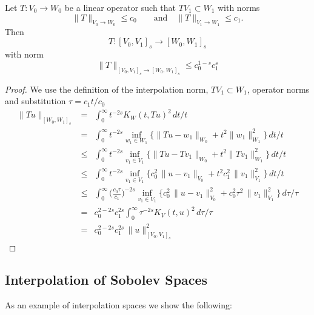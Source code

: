 \begin{theorem}
Let $T : V_0 \rightarrow W_0$ be a linear operator such that $T V_1 \subset W_1$ 
with norms
$$
\| T \|_{V_0 \rightarrow W_0} \leq c_0 \qquad \text{and} \quad 
\| T \|_{V_1 \rightarrow W_1} \leq c_1.
$$
Then
$$
T : [V_0,V_1]_s \rightarrow [W_0,W_1]_s
$$
with norm
$$
\| T \|_{[V_0,V_1]_s \rightarrow [W_0,W_1]_s} \leq c_0^{1-s} c_1^s
$$
\end{theorem} 
\begin{proof}
We use the definition of the interpolation norm, $T V_1 \subset W_1$, operator norms and substitution $\tau = c_1 t/c_0$
\begin{eqnarray*}
\| T u \|_{[W_0,W_1]_s} & = & \int_0^\infty t^{-2s} K_W(t,Tu)^2 \, dt/t \\
 & = & \int_0^\infty t^{-2s} \inf_{w_1 \in W_1} \{ \| T u - w_1 \|_{W_0} + t^2 \| w_1 \|_{W_1}^2 \} \, dt/t \\
 & \leq & \int_0^\infty t^{-2s} \inf_{v_1 \in V_1} \{ \| T u - T v_1 \|_{W_0} + t^2 \| T v_1 \|_{W_1}^2 \} \, dt/t \\
 & \leq & \int_0^\infty t^{-2s} \inf_{v_1 \in V_1} \{ c_0^2 \, \| u - v_1 \|_{V_0} + t^2 c_1^2 \, \| v_1 \|_{V_1}^2 \} \, dt/t \\
 & \leq & \int_0^\infty \Big( \frac{c_0 \tau}{c_1} \Big)^{-2s} \inf_{v_1 \in V_1}
\{ c_0^2 \, \| u - v_1 \|_{V_0}^2 + c_0^2 \tau^2 \, \| v_1 \|_{V_1}^2 \} \, d \tau / \tau \\
& = & c_0^{2-2s} c_1^{2s}  \int_0^\infty \tau^{-2s} K_V (t, u)^2 \, d \tau / \tau \\
& = &  c_0^{2-2s} c_1^{2s} \, \| u \|_{[V_0,V_1]_s}^2
\end{eqnarray*}
\end{proof}


\subsection{Interpolation of Sobolev Spaces}

As an example of interpolation spaces we show the following:

